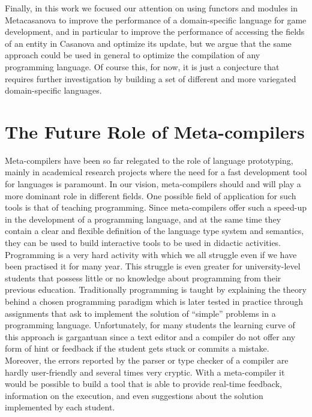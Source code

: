Finally, in this work we focused our attention on using functors and modules in Metacasanova to improve the performance of a domain-specific language for game development, and in particular to improve the performance of accessing the fields of an entity in Casanova and optimize its update, but we argue that the same approach could be used in general to optimize the compilation of any programming language. Of course this, for now, it is just a conjecture that requires further investigation by building a set of different and more variegated domain-specific languages.

\section{The Future Role of Meta-compilers}
\label{sec:ch_conclusion_future}
Meta-compilers have been so far relegated to the role of language prototyping, mainly in academical research projects where the need for a fast development tool for languages is paramount. In our vision, meta-compilers should and will play a more dominant role in different fields. One possible field of application for such tools is that of teaching programming. Since meta-compilers offer such a speed-up in the development of a programming language, and at the same time they contain a clear and flexible definition of the language type system and semantics, they can be used to build interactive tools to be used in didactic activities. Programming is a very hard activity with which we all struggle even if we have been practised it for many year. This struggle is even greater for university-level students that possess little or no knowledge about programming from their previous education. Traditionally programming is taught by explaining the theory behind a chosen programming paradigm which is later tested in practice through assignments that ask to implement the solution of ``simple'' problems in a programming language. Unfortunately, for many students the learning curve of this approach is gargantuan since a text editor and a compiler do not offer any form of hint or feedback if the student gets stuck or commits a mistake. Moreover, the errors reported by the parser or type checker of a compiler are hardly user-friendly and several times very cryptic. With a meta-compiler it would be possible to build a tool that is able to provide real-time feedback, information on the execution, and even suggestions about the solution implemented by each student.

